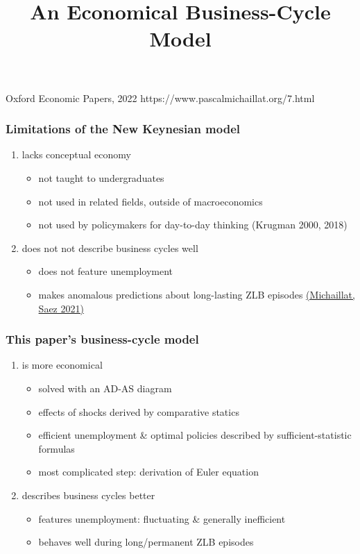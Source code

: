 \documentclass[12pt,xcolor={dvipsnames},hyperref={pdftex,pdfpagemode=UseNone,hidelinks,pdfdisplaydoctitle=true},usepdftitle=false]{beamer}
\begin{document}
\title{An Economical Business-Cycle Model}
%
{Oxford Economic Papers, 2022}%
{https://www.pascalmichaillat.org/7.html}
\frame[plain]{\titlepage}

\begin{frame}
\frametitle{Limitations of the New Keynesian model}
\begin{enumerate}
\item lacks conceptual economy
\begin{itemize}
\item not taught to undergraduates
\item not used in related fields, outside of macroeconomics
\item not used by policymakers for day-to-day thinking (Krugman 2000, 2018)
\end{itemize}
\item does not not describe business cycles well
\begin{itemize}
\item does not feature unemployment
\item makes anomalous predictions about long-lasting ZLB episodes \href{https://www.pascalmichaillat.org/11.html}{(Michaillat, Saez 2021)}
\end{itemize}
\end{enumerate}
\end{frame}

\begin{frame}
\frametitle{This paper's business-cycle model}
\begin{enumerate}
\item is more economical
\begin{itemize}
\item solved with an AD-AS diagram
\item effects of shocks derived by comparative statics
\item efficient unemployment \& optimal policies described by sufficient-statistic formulas
\item most complicated step: derivation of Euler equation
\end{itemize}
\item describes business cycles better
\begin{itemize}
\item features unemployment: fluctuating \& generally inefficient
\item behaves well during long/permanent ZLB episodes
\end{itemize}
\end{enumerate}
\end{frame}
\end{document}

